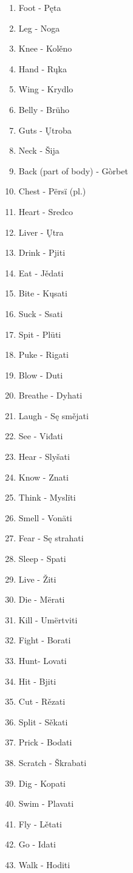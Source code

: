 \begin{multicols}{2}
\begin{enumerate}
	\item Foot - Pęta
	\item Leg - Noga
	\item Knee - Kolěno
	\item Hand - Rųka
	\item Wing - Krydlo
	\item Belly - Brüho
	\item Guts - Ųtroba
	\item Neck - Šija
	\item Back (part of body) - Gòrbet 
	\item Chest - Përsï (pl.)
	\item Heart - Sredco
	\item Liver - Ųtra
	\item Drink - Pjiti
	\item Eat - Jědati
	\item Bite - Kųsati
	\item Suck - Ssati
	\item Spit - Plüti
	\item Puke - Rigati
	\item Blow - Duti
	\item Breathe - Dyhati
	\item Laugh - Sę smějati
	\item See - Viđati
	\item Hear - Slyšati
	\item Know - Znati 
	\item Think - Myslïti
	\item Smell - Vonäti
	\item Fear - Sę strahati
	\item Sleep - Spati
	\item Live - Žiti
	\item Die - Mërati
	\item Kill - Umërtviti
	\item Fight - Borati
	\item Hunt- Lovati
	\item Hit - Bjiti
	\item Cut - Rězati
	\item Split - Sěkati 
	\item Prick - Bodati
	\item Scratch - Škrabati
	\item Dig - Kopati
	\item Swim - Plavati
	\item Fly - Lětati
	\item Go - Idati
	\item Walk - Hoditi

\end{enumerate}
\end{multicols}
